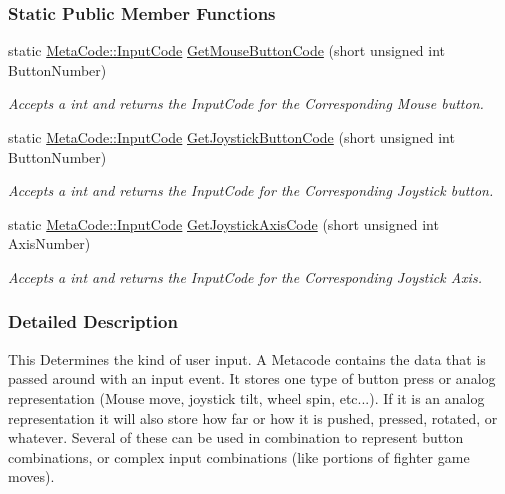 \subsubsection*{Static Public Member Functions}
\begin{DoxyCompactItemize}
\item 
static \hyperlink{classphys_1_1MetaCode_a3e501cbb5bf0f6f1fdb7211465bda8d8}{MetaCode::InputCode} \hyperlink{classphys_1_1MetaCode_a4c5475be837b3ea5cc66223d53ca3e1a}{GetMouseButtonCode} (short unsigned int ButtonNumber)
\begin{DoxyCompactList}\small\item\em Accepts a int and returns the InputCode for the Corresponding Mouse button. \item\end{DoxyCompactList}\item 
static \hyperlink{classphys_1_1MetaCode_a3e501cbb5bf0f6f1fdb7211465bda8d8}{MetaCode::InputCode} \hyperlink{classphys_1_1MetaCode_a5e6e5f53b8c581b68a4b7e0a217032ca}{GetJoystickButtonCode} (short unsigned int ButtonNumber)
\begin{DoxyCompactList}\small\item\em Accepts a int and returns the InputCode for the Corresponding Joystick button. \item\end{DoxyCompactList}\item 
static \hyperlink{classphys_1_1MetaCode_a3e501cbb5bf0f6f1fdb7211465bda8d8}{MetaCode::InputCode} \hyperlink{classphys_1_1MetaCode_ac09685ca056e3c5423adeae712a3c436}{GetJoystickAxisCode} (short unsigned int AxisNumber)
\begin{DoxyCompactList}\small\item\em Accepts a int and returns the InputCode for the Corresponding Joystick Axis. \item\end{DoxyCompactList}\end{DoxyCompactItemize}


\subsubsection{Detailed Description}
This Determines the kind of user input. A Metacode contains the data that is passed around with an input event. It stores one type of button press or analog representation (Mouse move, joystick tilt, wheel spin, etc...). If it is an analog representation it will also store how far or how it is pushed, pressed, rotated, or whatever. Several of these can be used in combination to represent button combinations, or complex input combinations (like portions of fighter game moves). 

